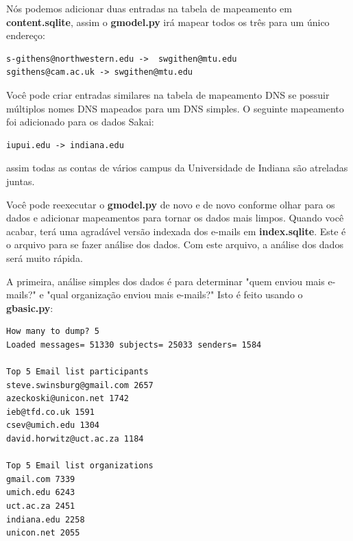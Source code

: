 Nós podemos adicionar duas entradas na tabela de mapeamento em {\bf content.sqlite},
assim o {\bf gmodel.py} irá mapear todos os três para um único endereço: 

\beforeverb
\begin{verbatim}
s-githens@northwestern.edu ->  swgithen@mtu.edu
sgithens@cam.ac.uk -> swgithen@mtu.edu
\end{verbatim}
\afterverb
%

Você pode criar entradas similares na tabela de mapeamento DNS se possuir múltiplos
nomes DNS mapeados para um DNS simples. O seguinte mapeamento foi adicionado para os 
dados Sakai: 

\beforeverb
\begin{verbatim}
iupui.edu -> indiana.edu
\end{verbatim}
\afterverb
%

assim todas as contas de vários campus da Universidade de Indiana são atreladas juntas.

Você pode reexecutar o {\bf gmodel.py} de novo e de novo conforme olhar para os dados e 
adicionar mapeamentos para tornar os dados mais limpos. Quando você acabar, terá uma
agradável versão indexada dos e-mails em {\bf index.sqlite}. Este é o arquivo para se fazer
análise dos dados. Com este arquivo, a análise dos dados será muito rápida. 

A primeira, análise simples dos dados é para determinar "quem enviou mais e-mails?" e 
"qual organização enviou mais e-mails?" Isto é feito usando o {\bf gbasic.py}:  

\beforeverb
\begin{verbatim}
How many to dump? 5
Loaded messages= 51330 subjects= 25033 senders= 1584

Top 5 Email list participants
steve.swinsburg@gmail.com 2657
azeckoski@unicon.net 1742
ieb@tfd.co.uk 1591
csev@umich.edu 1304
david.horwitz@uct.ac.za 1184

Top 5 Email list organizations
gmail.com 7339
umich.edu 6243
uct.ac.za 2451
indiana.edu 2258
unicon.net 2055
\end{verbatim}
\afterverb
%

